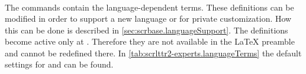 \begin{Declaration}
  \\
  \\
  \\
  \\
  \\
  \\
  \\
  \\
  \\
  \\
  \\
  \\
  \\
  \\
  \\
  \\
\end{Declaration}
%
%
%
%
%
%
%
%
%
%
The commands contain the language-dependent terms. These definitions can be
modified in order to support a new language or for private customization.
How this can be done is described in
\autoref{sec:scrbase.languageSupport}. The definitions become active only at
.  Therefore they are not available in the
{\LaTeX} preamble and cannot be redefined there. In
\autoref{tab:scrlttr2-experts.languageTerms} the default settings for
 and  can be found.%
%
